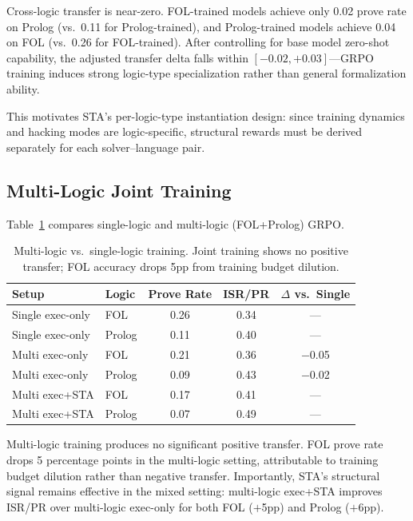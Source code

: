 \documentclass[11pt,a4paper]{article}
\begin{document}
Cross-logic transfer is near-zero.
FOL-trained models achieve only 0.02 prove rate on Prolog (vs.\ 0.11 for Prolog-trained), and Prolog-trained models achieve 0.04 on FOL (vs.\ 0.26 for FOL-trained).
After controlling for base model zero-shot capability, the adjusted transfer delta falls within $[-0.02, +0.03]$---GRPO training induces strong logic-type specialization rather than general formalization ability.

This motivates STA's per-logic-type instantiation design: since training dynamics and hacking modes are logic-specific, structural rewards must be derived separately for each solver--language pair.

\subsection{Multi-Logic Joint Training}

Table~\ref{tab:multi_logic} compares single-logic and multi-logic (FOL+Prolog) GRPO.

\begin{table}[t]
\centering
\small
\caption{Multi-logic vs.\ single-logic training. Joint training shows no positive transfer; FOL accuracy drops 5pp from training budget dilution.}
\label{tab:multi_logic}
\begin{tabular}{llccc}
\toprule
Setup & Logic & Prove Rate & ISR/PR & $\Delta$ vs.\ Single \\
\midrule
Single exec-only & FOL    & 0.26 & 0.34 & --- \\
Single exec-only & Prolog & 0.11 & 0.40 & --- \\
Multi exec-only  & FOL    & 0.21 & 0.36 & $-$0.05 \\
Multi exec-only  & Prolog & 0.09 & 0.43 & $-$0.02 \\
Multi exec+STA   & FOL    & 0.17 & 0.41 & --- \\
Multi exec+STA   & Prolog & 0.07 & 0.49 & --- \\
\bottomrule
\end{tabular}
\end{table}

Multi-logic training produces no significant positive transfer.
FOL prove rate drops 5 percentage points in the multi-logic setting, attributable to training budget dilution rather than negative transfer.
Importantly, STA's structural signal remains effective in the mixed setting: multi-logic exec+STA improves ISR/PR over multi-logic exec-only for both FOL ($+$5pp) and Prolog ($+$6pp).
\end{document}
